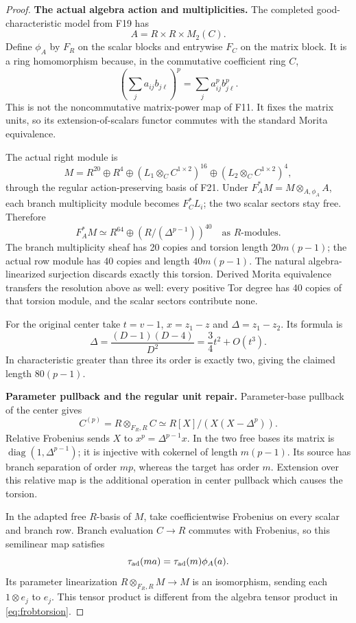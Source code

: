 \documentclass[11pt,a4paper]{article}
\newcommand{\fid}[1]{\textsf{#1}}\newcommand{\gate}[1]{\textsf{#1}}
\theoremstyle{named}\newtheorem{finding}{Finding}[section]
\theoremstyle{definition}\newtheorem{definition}[finding]{Definition}
\theoremstyle{remark}\newtheorem{remark}[finding]{Remark}
\begin{document}
\begin{proof}
\par\smallskip\noindent\textbf{The actual algebra action and multiplicities.}\quad
The completed good-characteristic model from \fid{F19} has
\[
 A=R\times R\times M_2(C).
\]
Define $\phi_A$ by $F_R$ on the scalar blocks and entrywise $F_C$
on the matrix block. It is a ring homomorphism because, in the
commutative coefficient ring $C$,
\[
 \left(\sum_j a_{ij}b_{j\ell}\right)^p
       =\sum_j a_{ij}^p b_{j\ell}^p.
\]
This is not the noncommutative matrix-power map of \fid{F11}.
It fixes the matrix units, so its extension-of-scalars functor
commutes with the standard Morita equivalence.

The actual right module is
\[
 M=R^{20}\oplus R^4\oplus
    (L_1\otimes_C C^{1\times2})^{16}
       \oplus(L_2\otimes_C C^{1\times2})^4,
\]
through the regular action-preserving basis of \fid{F21}. Under
$F_A^*M=M\otimes_{A,\phi_A}A$, each branch multiplicity module
becomes $F_C^*L_i$; the two scalar sectors stay free. Therefore
\begin{equation}\label{eq:frobtorsion}
 F_A^*M\simeq R^{64}\oplus
          (R/(\Delta^{p-1}))^{40}
 \quad\text{as }R\text{-modules}.
\end{equation}
The branch multiplicity sheaf has 20 copies and torsion length
$20m(p-1)$; the actual row module has 40 copies and length
$40m(p-1)$. The natural algebra-linearized surjection discards
exactly this torsion. Derived Morita equivalence transfers the
resolution above as well: every positive Tor degree has 40 copies
of that torsion module, and the scalar sectors contribute none.

For the original center take $t=v-1$, $x=z_1-z$ and
$\Delta=z_1-z_2$. Its formula is
\[
 \Delta=\frac{(D-1)(D-4)}{D^2}
        =\frac34t^2+O(t^3).
\]
In characteristic greater than three its order is exactly two,
giving the claimed length $80(p-1)$.

\par\smallskip\noindent\textbf{Parameter pullback and the regular unit repair.}\quad
Parameter-base pullback of the center gives
\[
 C^{(p)}=R\otimes_{F_R,R}C
       \simeq R[X]/(X(X-\Delta^p)).
\]
Relative Frobenius sends $X$ to $x^p=\Delta^{p-1}x$.
In the two free bases its matrix is
$\operatorname{diag}(1,\Delta^{p-1})$; it is injective with
cokernel of length $m(p-1)$. Its source has branch separation of
order $mp$, whereas the target has order $m$. Extension over this
relative map is the additional operation in center pullback which
causes the torsion.

In the adapted free $R$-basis of $M$, take coefficientwise
Frobenius on every scalar and branch row. Branch evaluation
$C\to R$ commutes with Frobenius, so this semilinear map satisfies
\[
 \tau_{\rm ad}(ma)=\tau_{\rm ad}(m)\phi_A(a).
\]
Its parameter linearization
$R\otimes_{F_R,R}M\to M$ is an isomorphism, sending each
$1\otimes e_j$ to $e_j$. This tensor product is different from
the algebra tensor product in \eqref{eq:frobtorsion}.


\end{proof}
\end{document}
